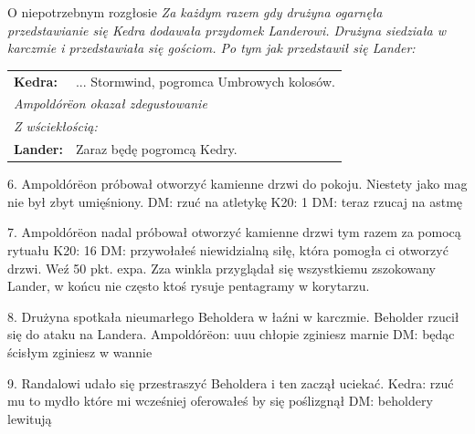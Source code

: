 \documentclass[10pt,twoside,twocolumn]{book}
\begin{document}
\begin{rpg-quotebox}{O niepotrzebnym rozgłosie}
   \textit{Za każdym razem gdy drużyna ogarnęła przedstawianie się Kedra dodawała przydomek Landerowi. Drużyna siedziała w karczmie i przedstawiała się gościom. Po tym jak przedstawił się Lander:}\\

   \begin{tabularx}{\columnwidth}{lX}
      \textbf{Kedra:} & ... Stormwind, pogromca Umbrowych kolosów.\\
      \multicolumn{2}{l}{\textit{Ampoldórëon okazał zdegustowanie}}\\
      \multicolumn{2}{l}{\textit{Z wściekłością:}}\\
      \textbf{Lander:} & Zaraz będę pogromcą Kedry.\\
   \end{tabularx}
\end{rpg-quotebox}


6.  Ampoldórëon próbował otworzyć kamienne drzwi do pokoju. Niestety jako mag nie był zbyt umięśniony.
DM: rzuć na atletykę
K20: 1
DM: teraz rzucaj na astmę

7. Ampoldórëon nadal próbował otworzyć kamienne drzwi tym razem za pomocą rytuału
K20: 16
DM: przywołałeś niewidzialną siłę, która pomogła ci otworzyć drzwi. Weź 50 pkt. expa.
Zza winkla przyglądał się wszystkiemu zszokowany Lander, w końcu nie często ktoś rysuje pentagramy w korytarzu.

8. Drużyna spotkała nieumarłego Beholdera w łaźni w karczmie. Beholder rzucił się do ataku na Landera.
Ampoldórëon: uuu chłopie zginiesz marnie
DM: będąc ścisłym zginiesz w wannie

9.  Randalowi udało się przestraszyć Beholdera i ten zaczął uciekać.
Kedra: rzuć mu to mydło które mi wcześniej oferowałeś by się poślizgnął
DM: beholdery lewitują
\end{document}
